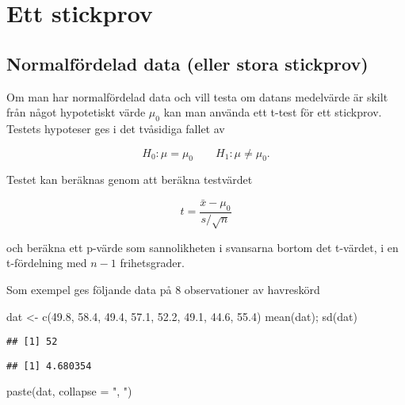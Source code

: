 \documentclass[
]{book}
\newenvironment{Shaded}{\begin{snugshade}}{\end{snugshade}}
\newcommand{\AttributeTok}[1]{\textcolor[rgb]{0.77,0.63,0.00}{#1}}
\newcommand{\FloatTok}[1]{\textcolor[rgb]{0.00,0.00,0.81}{#1}}
\newcommand{\FunctionTok}[1]{\textcolor[rgb]{0.00,0.00,0.00}{#1}}
\newcommand{\NormalTok}[1]{#1}
\newcommand{\OtherTok}[1]{\textcolor[rgb]{0.56,0.35,0.01}{#1}}
\newcommand{\StringTok}[1]{\textcolor[rgb]{0.31,0.60,0.02}{#1}}
\theoremstyle{definition}
\theoremstyle{definition}
\theoremstyle{definition}
\theoremstyle{definition}
\theoremstyle{remark}
\begin{document}
\hypertarget{ett-stickprov}{%
\chapter{Ett stickprov}\label{ett-stickprov}}

\hypertarget{normalfuxf6rdelad-data-eller-stora-stickprov}{%
\section{Normalfördelad data (eller stora stickprov)}\label{normalfuxf6rdelad-data-eller-stora-stickprov}}

Om man har normalfördelad data och vill testa om datans medelvärde är skilt från något hypotetiskt värde \(\mu_0\) kan man använda ett t-test för ett stickprov. Testets hypoteser ges i det tvåsidiga fallet av

\[H_0: \mu = \mu_0 \qquad H_1: \mu \neq \mu_0.\]

Testet kan beräknas genom att beräkna testvärdet

\[t = \frac{\bar x - \mu_0}{s / \sqrt n}\]

och beräkna ett p-värde som sannolikheten i svansarna bortom det t-värdet, i en t-fördelning med \(n-1\) frihetsgrader.

Som exempel ges följande data på 8 observationer av havreskörd

\begin{Shaded}
\begin{Highlighting}[]
\NormalTok{dat }\OtherTok{\textless{}{-}} \FunctionTok{c}\NormalTok{(}\FloatTok{49.8}\NormalTok{, }\FloatTok{58.4}\NormalTok{, }\FloatTok{49.4}\NormalTok{, }\FloatTok{57.1}\NormalTok{, }\FloatTok{52.2}\NormalTok{, }\FloatTok{49.1}\NormalTok{, }\FloatTok{44.6}\NormalTok{, }\FloatTok{55.4}\NormalTok{)}
\FunctionTok{mean}\NormalTok{(dat); }\FunctionTok{sd}\NormalTok{(dat)}
\end{Highlighting}
\end{Shaded}

\begin{verbatim}
## [1] 52
\end{verbatim}

\begin{verbatim}
## [1] 4.680354
\end{verbatim}

\begin{Shaded}
\begin{Highlighting}[]
\FunctionTok{paste}\NormalTok{(dat, }\AttributeTok{collapse =} \StringTok{", "}\NormalTok{)}
\end{Highlighting}
\end{Shaded}
\end{document}
